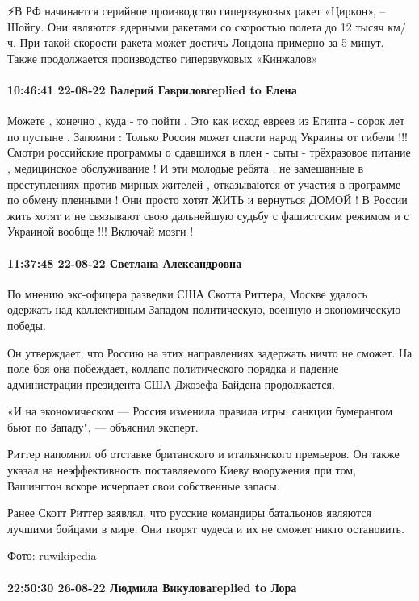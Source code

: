 ⚡В РФ начинается серийное производство гиперзвуковых ракет «Циркон», – Шойгу.
Они являются ядерными ракетами со скоростью полета до 12 тысяч км/ч. При такой скорости ракета может достичь Лондона примерно за 5 минут. Также продолжается производство гиперзвуковых «Кинжалов»


\paragraph{10:46:41 22-08-22 Валерий Гавриловreplied to Елена}

Можете , конечно , куда - то пойти . Это как исход евреев из Египта - сорок лет по пустыне . Запомни : Только Россия может спасти народ Украины от гибели !!! Смотри российские программы о сдавшихся в плен - сыты - трёхразовое питание , медицинское обслуживание ! И эти молодые ребята , не замешанные в преступлениях против мирных жителей , отказываются от участия в программе по обмену пленными ! Они просто хотят ЖИТЬ и вернуться ДОМОЙ ! В России жить хотят и не связывают свою дальнейшую судьбу с фашистским режимом и с Украиной вообще !!! Включай мозги !

\paragraph{11:37:48 22-08-22 Светлана Александровна}

По мнению экс-офицера разведки США Скотта Риттера, Москве удалось одержать над
коллективным Западом политическую, военную и экономическую победы.

Он утверждает, что Россию на этих направлениях задержать ничто не сможет. На
поле боя она побеждает, коллапс политического порядка и падение администрации
президента США Джозефа Байдена продолжается.

«И на экономическом — Россия изменила правила игры: санкции бумерангом бьют по
Западу", — объяснил эксперт.

Риттер напомнил об отставке британского и итальянского премьеров. Он также
указал на неэффективность поставляемого Киеву вооружения при том, Вашингтон
вскоре исчерпает свои собственные запасы.

Ранее Скотт Риттер заявлял, что русские командиры батальонов являются лучшими
бойцами в мире. Они творят чудеса и их не сможет никто остановить.

Фото: ruwikipedia

\paragraph{22:50:30 26-08-22 Людмила Викуловаreplied to Лора}

